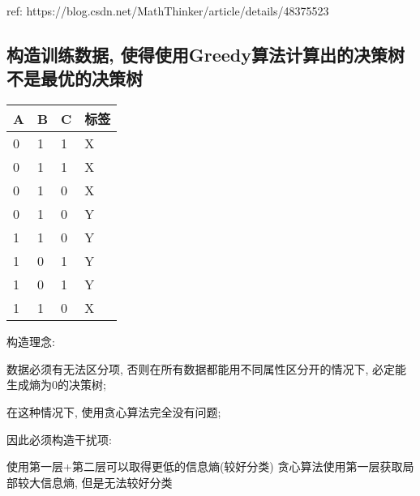 ref: https://blog.csdn.net/MathThinker/article/details/48375523

\hypertarget{ux6784ux9020ux8badux7ec3ux6570ux636e-ux4f7fux5f97ux4f7fux7528greedyux7b97ux6cd5ux8ba1ux7b97ux51faux7684ux51b3ux7b56ux6811ux4e0dux662fux6700ux4f18ux7684ux51b3ux7b56ux6811}{%
\subsection{构造训练数据,
使得使用Greedy算法计算出的决策树不是最优的决策树}\label{ux6784ux9020ux8badux7ec3ux6570ux636e-ux4f7fux5f97ux4f7fux7528greedyux7b97ux6cd5ux8ba1ux7b97ux51faux7684ux51b3ux7b56ux6811ux4e0dux662fux6700ux4f18ux7684ux51b3ux7b56ux6811}}

\begin{longtable}[]{@{}llll@{}}
\toprule
A & B & C & 标签\tabularnewline
\midrule
\endhead
0 & 1 & 1 & X\tabularnewline
0 & 1 & 1 & X\tabularnewline
0 & 1 & 0 & X\tabularnewline
0 & 1 & 0 & Y\tabularnewline
1 & 1 & 0 & Y\tabularnewline
1 & 0 & 1 & Y\tabularnewline
1 & 0 & 1 & Y\tabularnewline
1 & 1 & 0 & X\tabularnewline
\bottomrule
\end{longtable}

构造理念:

数据必须有无法区分项, 否则在所有数据都能用不同属性区分开的情况下,
必定能生成熵为0的决策树;

在这种情况下, 使用贪心算法完全没有问题;

因此必须构造干扰项:

使用第一层+第二层可以取得更低的信息熵(较好分类)
贪心算法使用第一层获取局部较大信息熵, 但是无法较好分类
